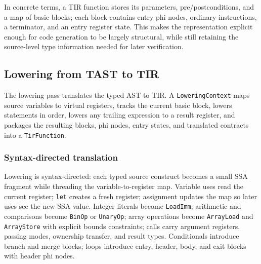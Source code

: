 In concrete terms, a TIR function stores its parameters, pre/postconditions, and a map of basic blocks; each block contains entry phi nodes, ordinary instructions, a terminator, and an entry register state. This makes the representation explicit enough for code generation to be largely structural, while still retaining the source-level type information needed for later verification.

\subsection{Lowering from TAST to TIR}

The lowering pass translates the typed AST to TIR. A \texttt{LoweringContext} maps source variables to virtual registers, tracks the current basic block, lowers statements in order, lowers any trailing expression to a result register, and packages the resulting blocks, phi nodes, entry states, and translated contracts into a \texttt{TirFunction}.

\subsubsection{Syntax-directed translation}

Lowering is syntax-directed: each typed source construct becomes a small SSA fragment while threading the variable-to-register map. Variable uses read the current register; \texttt{let} creates a fresh register; assignment updates the map so later uses see the new SSA value. Integer literals become \texttt{LoadImm}; arithmetic and comparisons become \texttt{BinOp} or \texttt{UnaryOp}; array operations become \texttt{ArrayLoad} and \texttt{ArrayStore} with explicit bounds constraints; calls carry argument registers, passing modes, ownership transfer, and result types. Conditionals introduce branch and merge blocks; loops introduce entry, header, body, and exit blocks with header phi nodes.

